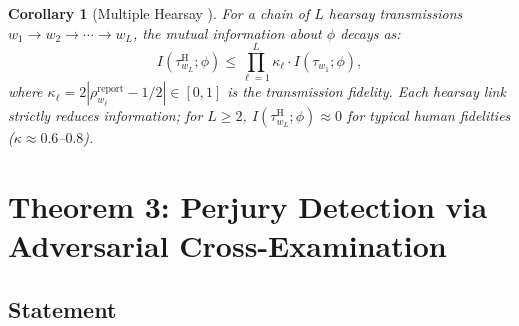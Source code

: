 \documentclass[11pt,a4paper]{article}
\newtheorem{corollary}[theorem]{Corollary}
\theoremstyle{definition}
\newcommand{\abs}[1]{\left|#1\right|}
\newcommand{\fact}{\phi}                        %
\newcommand{\hear}{\mathrm{H}}                  %
\begin{document}
\begin{corollary}[Multiple Hearsay ]
\label{cor:multiple_hearsay}
For a chain of $L$ hearsay transmissions $w_1 \to w_2 \to \cdots \to w_L$, the mutual information about $\fact$ decays as:
\begin{equation}
    I(\tau_{w_L}^{\hear}; \fact) \leq \prod_{\ell=1}^{L} \kappa_\ell \cdot I(\tau_{w_1}; \fact),
    \label{eq:multi_hearsay}
\end{equation}
where $\kappa_\ell = 2\abs{\rho_{w_\ell}^{\mathrm{report}} - 1/2} \in [0, 1]$ is the transmission fidelity. Each hearsay link strictly reduces information; for $L \geq 2$, $I(\tau_{w_L}^{\hear}; \fact) \approx 0$ for typical human fidelities ($\kappa \approx 0.6$--$0.8$).
\end{corollary}

\section{Theorem 3: Perjury Detection via Adversarial Cross-Examination }
\label{sec:perjury}

\subsection{Statement}
\end{document}
